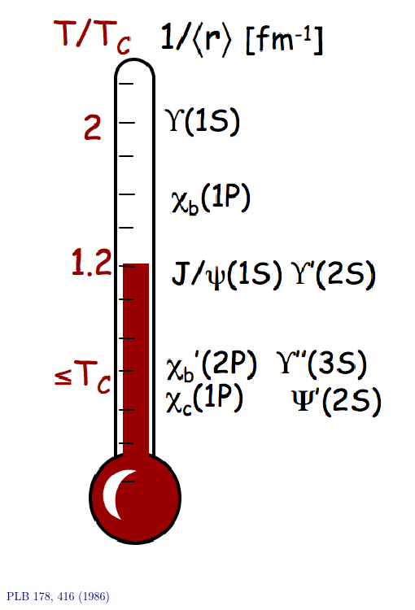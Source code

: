 \documentclass[compress]{beamer}
\begin{document}
\begin{frame}
\begin{columns}
\vspace{0.2 cm}
\hfill \includegraphics[width=0.75\linewidth]{dimuons/thermometer.png}
\end{columns}

\hfill \textcolor{darkblue}{\scriptsize PLB 178, 416 (1986)}
\end{frame}
\end{document}
